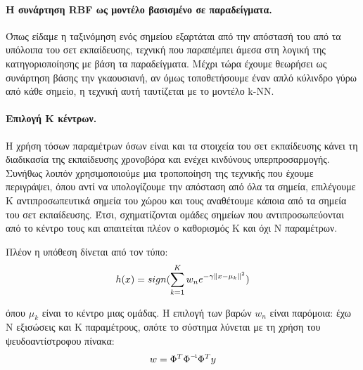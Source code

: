 \paragraph{H συνάρτηση RBF ως μοντέλο βασισμένο σε παραδείγματα.} Όπως είδαμε η ταξινόμηση ενός σημείου εξαρτάται από την απόστασή του από τα υπόλοιπα του σετ εκπαίδευσης, τεχνική που παραπέμπει άμεσα στη λογική της κατηγοριοποίησης με βάση τα παραδείγματα. Μέχρι τώρα έχουμε θεωρήσει ως συνάρτηση βάσης την γκαουσιανή, αν όμως τοποθετήσουμε έναν απλό κύλινδρο γύρω από κάθε σημείο, η τεχνική αυτή ταυτίζεται με το μοντέλο k-NN.
\paragraph{Επιλογή Κ κέντρων.} Η χρήση τόσων παραμέτρων όσων είναι και τα στοιχεία του σετ εκπαίδευσης κάνει τη διαδικασία της εκπαίδευσης χρονοβόρα και ενέχει κινδύνους υπερπροσαρμογής. Συνήθως λοιπόν χρησιμοποιούμε μια τροποποίηση της τεχνικής που έχουμε περιγράψει, όπου αντί να υπολογίζουμε την απόσταση από όλα τα σημεία, επιλέγουμε Κ αντιπροσωπευτικά σημεία του χώρου και τους αναθέτουμε κάποια από τα σημεία του σετ εκπαίδευσης. Έτσι, σχηματίζονται ομάδες σημείων που αντιπροσωπεύονται από το κέντρο τους και απαιτείται πλέον ο καθορισμός Κ και όχι Ν παραμέτρων.

Πλέον η υπόθεση δίνεται από τον τύπο:
\begin{equation}
h(x)= sign( \sum_{k=1}^{K} w_n e^{-\gamma \left\lVert x - \mu_k\right\rVert^2})
\end{equation}

όπου $\mu_k$ είναι το κέντρο μιας ομάδας. Η επιλογή των βαρών $w_n$ είναι παρόμοια: έχω Ν εξισώσεις και Κ παραμέτρους, οπότε το σύστημα λύνεται με τη χρήση του ψευδοαντίστροφου πίνακα:
\begin{equation}
w= \inv{\Phi^T \Phi} \Phi^T y
\end{equation}
	
